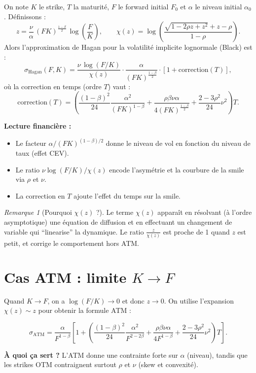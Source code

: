 \documentclass[11pt,a4paper]{report}
\newcommand{\1}{\mathbbm{1}}
\theoremstyle{definition}
\theoremstyle{plain}
\theoremstyle{remark}
\newtheorem{remark}{Remarque}[chapter]
\begin{document}
On note $K$ le strike, $T$ la maturité, $F$ le forward initial $F_0$ et $\alpha$ le niveau initial $\alpha_0$.
Définissons :
\[
z = \frac{\nu}{\alpha}\,(F K)^{\frac{1-\beta}{2}}\,\log\left(\frac{F}{K}\right),
\qquad
\chi(z)=\log\left(\frac{\sqrt{1-2\rho z+z^2}+z-\rho}{1-\rho}\right).
\]
Alors l'approximation de Hagan pour la volatilité implicite lognormale (Black) est :
\[
\sigma_{\mathrm{Hagan}}(F,K)
=
\frac{\nu\,\log(F/K)}{\chi(z)}\cdot
\frac{\alpha}{(F K)^{\frac{1-\beta}{2}}}
\cdot
\left[1 + \text{correction}(T)\right],
\]
où la correction en temps (ordre $T$) vaut :
\[
\text{correction}(T)
=
\left(
\frac{(1-\beta)^2}{24}\frac{\alpha^2}{(F K)^{1-\beta}}
+
\frac{\rho\beta\nu\alpha}{4(F K)^{\frac{1-\beta}{2}}}
+
\frac{2-3\rho^2}{24}\nu^2
\right)T.
\]

\textbf{Lecture financière :}
\begin{itemize}
  \item Le facteur $\alpha/(FK)^{(1-\beta)/2}$ donne le niveau de vol en fonction du niveau de taux (effet CEV).
  \item Le ratio $\nu\log(F/K)/\chi(z)$ encode l'asymétrie et la courbure de la smile via $\rho$ et $\nu$.
  \item La correction en $T$ ajoute l'effet du temps sur la smile.
\end{itemize}

\begin{remark}[Pourquoi $\chi(z)$ ?]
Le terme $\chi(z)$ apparaît en résolvant (à l'ordre asymptotique) une équation de diffusion
et en effectuant un changement de variable qui ``linearise'' la dynamique.
Le ratio $\frac{z}{\chi(z)}$ est proche de 1 quand $z$ est petit, et corrige le comportement hors ATM.
\end{remark}

\section{Cas ATM : limite $K\to F$}
Quand $K\to F$, on a $\log(F/K)\to 0$ et donc $z\to 0$.
On utilise l'expansion $\chi(z)\sim z$ pour obtenir la formule ATM :

\[
\sigma_{\mathrm{ATM}}
=
\frac{\alpha}{F^{1-\beta}}
\left[
1 +
\left(
\frac{(1-\beta)^2}{24}\frac{\alpha^2}{F^{2-2\beta}}
+
\frac{\rho\beta\nu\alpha}{4F^{1-\beta}}
+
\frac{2-3\rho^2}{24}\nu^2
\right)T
\right].
\]

\textbf{À quoi ça sert ?}
L'ATM donne une contrainte forte sur $\alpha$ (niveau), tandis que les strikes OTM contraignent surtout $\rho$ et $\nu$ (skew et convexité).
\end{document}
